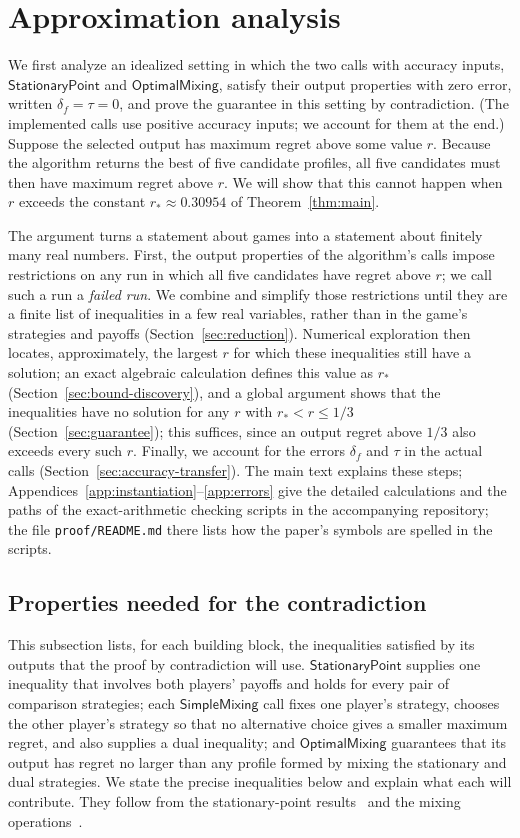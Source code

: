 \documentclass[11pt]{article}
\theoremstyle{remark}
\theoremstyle{plain}
\newcommand{\sm}{\mathsf{SimpleMixing}}
\newcommand{\om}{\mathsf{OptimalMixing}}
\newcommand{\spoint}{\mathsf{StationaryPoint}}
\begin{document}
\FloatBarrier
\section{Approximation analysis}
\label{sec:analysis}

We first analyze an idealized setting in which the two calls with
accuracy inputs, $\spoint$ and $\om$, satisfy their output
properties with zero error, written $\delta_f=\tau=0$, and prove
the guarantee in this setting by contradiction. (The implemented
calls use positive accuracy inputs; we account for them at the end.)
Suppose the selected output has maximum regret above some value $r$.
Because the algorithm returns the best of five candidate profiles,
all five candidates must then have maximum regret above $r$. We will
show that this cannot happen when $r$ exceeds the constant
$r_*\approx0.30954$ of Theorem~\ref{thm:main}.

The argument turns a statement about games into a statement about
finitely many real numbers. First, the output properties of the
algorithm's calls impose restrictions on any run in which all five
candidates have regret above $r$; we call such a run a \emph{failed
run}. We combine and simplify those restrictions until they are a
finite list of inequalities in a few real variables, rather than in
the game's strategies and payoffs (Section~\ref{sec:reduction}).
Numerical exploration then locates, approximately, the largest $r$
for which these inequalities still have a solution; an exact
algebraic calculation defines this value as $r_*$
(Section~\ref{sec:bound-discovery}), and a global argument shows
that the inequalities have no solution for any $r$ with
$r_*<r\le1/3$ (Section~\ref{sec:guarantee}); this suffices, since
an output regret above $1/3$ also exceeds every such $r$. Finally, we account for the errors
$\delta_f$ and $\tau$ in the actual calls
(Section~\ref{sec:accuracy-transfer}). The main text explains these
steps; Appendices~\ref{app:instantiation}--\ref{app:errors} give the
detailed calculations and the paths of the exact-arithmetic checking
scripts in the accompanying repository; the file
\nolinkurl{proof/README.md} there lists how the paper's symbols are
spelled in the scripts.

\subsection{Properties needed for the contradiction}
\label{sec:properties}

This subsection lists, for each building block, the inequalities
satisfied by its outputs that the proof by contradiction will use.
$\spoint$ supplies one inequality that involves both players' payoffs
and holds for every pair of comparison strategies; each $\sm$ call
fixes one player's strategy, chooses the other player's strategy so
that no alternative choice gives a smaller maximum regret, and also
supplies a dual inequality;
and $\om$ guarantees that its output has regret no larger than any
profile formed by mixing the stationary and dual strategies. We
state the precise inequalities below and explain what each will
contribute. They follow from the stationary-point
results~\cite{ts2008,tightness2023} and the mixing
operations~\cite{automating2025,mixing2025}.
\end{document}

